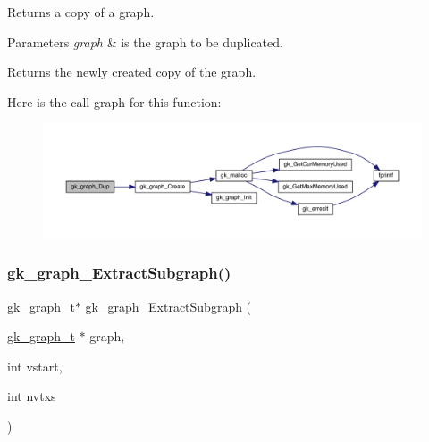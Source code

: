 Returns a copy of a graph. 
\begin{DoxyParams}{Parameters}
{\em graph} & is the graph to be duplicated. \\
\hline
\end{DoxyParams}
\begin{DoxyReturn}{Returns}
the newly created copy of the graph. 
\end{DoxyReturn}
Here is the call graph for this function\+:\nopagebreak
\begin{figure}[H]
\begin{center}
\leavevmode
\includegraphics[width=350pt]{a00846_a24db906b45a9848fc26c49cb967d68c8_cgraph}
\end{center}
\end{figure}
\mbox{\label{a00846_a1d2e1fe0550575de31f32a8c146f6643}} 
\subsubsection{\texorpdfstring{gk\+\_\+graph\+\_\+\+Extract\+Subgraph()}{gk\_graph\_ExtractSubgraph()}}
{\footnotesize\ttfamily \hyperlink{a00638}{gk\+\_\+graph\+\_\+t}$\ast$ gk\+\_\+graph\+\_\+\+Extract\+Subgraph (\begin{DoxyParamCaption}\item[{\hyperlink{a00638}{gk\+\_\+graph\+\_\+t} $\ast$}]{graph,  }\item[{int}]{vstart,  }\item[{int}]{nvtxs }\end{DoxyParamCaption})}

